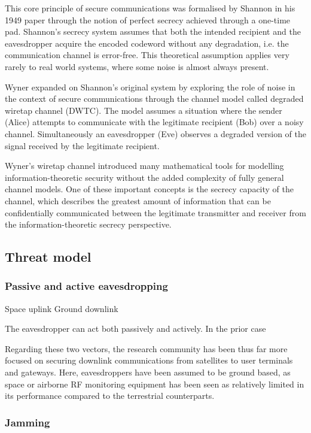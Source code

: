 \documentclass[english, 12pt, a4paper, elec, utf8, a-1b, online]{aaltothesis}
\begin{document}
This core principle of secure communications was formalised by Shannon in his 1949 paper through the notion of perfect secrecy achieved through a one-time pad. Shannon’s secrecy system assumes that both the intended recipient and the eavesdropper acquire the encoded codeword without any degradation, i.e. the communication channel is error-free. This theoretical assumption applies very rarely to real world systems, where some noise is almost always present. \cite{bloch2011physical}

Wyner expanded on Shannon’s original system by exploring the role of noise in the context of secure communications through the channel model called degraded wiretap channel (DWTC). The model assumes a situation where the sender (Alice) attempts to communicate with the legitimate recipient (Bob) over a noisy channel. Simultaneously an eavesdropper (Eve) observes a degraded version of the signal received by the legitimate recipient. \cite{barros2006secrecy}

Wyner’s wiretap channel introduced many mathematical tools for modelling information-theoretic security without the added complexity of fully general channel models. One of these important concepts is the secrecy capacity of the channel, which describes the greatest amount of information that can be confidentially communicated between the legitimate transmitter and receiver from the information-theoretic secrecy perspective. \cite{bloch2011physical}

\clearpage

\subsection{Threat model}
\subsubsection{Passive and active eavesdropping}
Space uplink
Ground downlink

The eavesdropper can act both passively and actively. In the prior case 

Regarding these two vectors, the research community has been thus far more focused on securing downlink communications from satellites to user terminals and gateways. Here, eavesdroppers have been assumed to be ground based, as space or airborne RF monitoring equipment has been seen as relatively limited in its performance compared to the terrestrial counterparts.

\subsubsection{Jamming}
\end{document}
